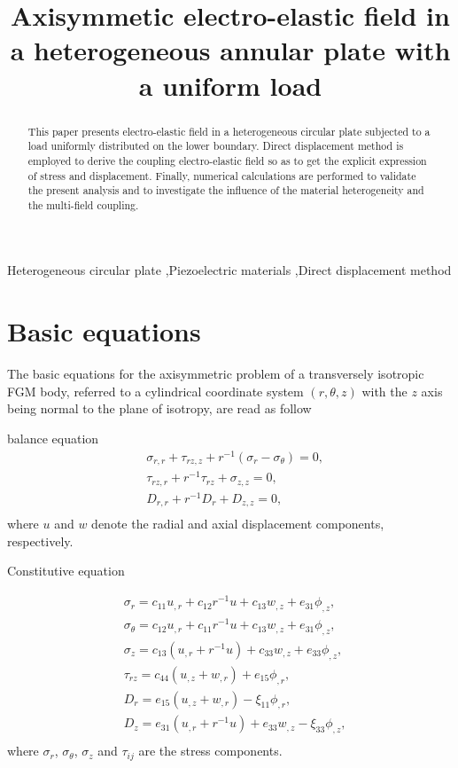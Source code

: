 \documentclass[12pt,sort&compress,fleqn,3p]{elsarticle}
\newcommand{\jiaobiao}[2]{ {#1} _ {#2} }
\newcommand{\qiudao}[3]{ {#1} _ {{#2} , {#3}} }
\begin{document}
\begin{frontmatter}
\title{\textbf{Axisymmetic electro-elastic field in a heterogeneous  annular plate with a uniform load }}
\begin{abstract}
This paper presents electro-elastic field in a heterogeneous circular plate subjected to a load uniformly distributed on the lower boundary. Direct displacement method is employed to derive the coupling electro-elastic field so as to get the explicit expression of stress and displacement.  Finally, numerical calculations are performed to validate the present analysis and to investigate the influence of the material heterogeneity and the multi-field coupling.

\end{abstract}
\begin{keyword}
Heterogeneous circular plate \sep Piezoelectric materials \sep Direct displacement method
\end{keyword}

\end{frontmatter}
\section{Basic equations}
The basic equations for the axisymmetric problem of a transversely isotropic FGM body, referred to a
cylindrical coordinate system $(r, \theta, z)$ with the $z$ axis being normal to the plane of isotropy, are read as follow

balance equation
\begin{equation}\label{labeq_balanceEq}
\begin{split}
&\qiudao{\sigma}{r}{r}+\qiudao{\tau}{rz}{z}+r^{-1}(\jiaobiao{\sigma}{r}-\jiaobiao{\sigma}{\theta})=0,\\
&\tau_{rz,r}+r^{-1}\tau_{rz}+\sigma_{z,z}=0,\\
&D_{r,r}+r^{-1}D_r +D_{z,z}=0,\\
\end{split}
\end{equation}
where  $ u $ and $ w $ denote the radial and axial displacement components, respectively.

Constitutive equation

\begin{equation}\label{labeq_ConsEq}
\begin{split}
&\sigma_r=c_{11}u_{,r}+c_{12}r^{-1}u+c_{13}w_{,z}+e_{31}\phi_{,z},\\
&\sigma_\theta=c_{12}u_{,r}+c_{11}r^{-1}u+c_{13}w_{,z}+e_{31}\phi_{,z}, \\
&\sigma_z=c_{13}(u_{,r}+r^{-1}u)+c_{33}w_{,z}+e_{33}\phi_{,z},\\
&\tau_{rz}=c_{44}(u_{,z}+w_{,r})+e_{15}\phi_{,r},\\
&D_r=e_{15}(u_{,z}+w_{,r})-\xi_{11}\phi_{,r},\\
&D_z=e_{31}(u_{,r}+r^{-1}u)+e_{33}w_{,z}-\xi_{33}\phi_{,z},\\
\end{split}
\end{equation}
where $ \sigma_r  $,       $ \sigma_\theta  $,      $ \sigma_z  $  and   $ \tau_{ij}   $ are the stress components.
\end{document}
